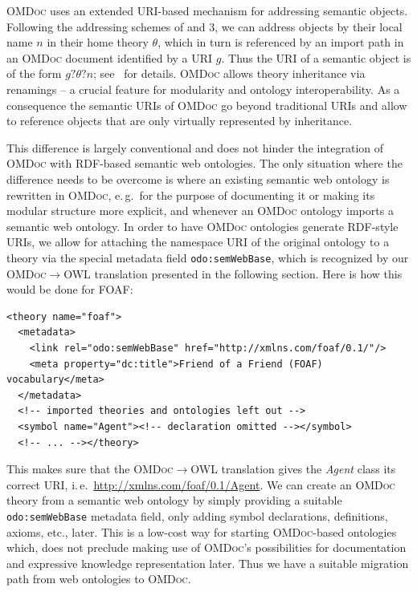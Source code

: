 \documentclass{llncs}
\renewcommand{\omdoc}{\textsc{OMDoc}\xspace}
\begin{document}
\omdoc uses an extended URI-based mechanism for addressing semantic objects. Following the
addressing schemes of {\openmath} and {\mathml}3, we can address objects by their local
name $n$ in their home theory $\theta$, which in turn is referenced by an import path in
an {\omdoc} document identified by a URI $g$. Thus the URI of a semantic object is of the
form $g?\theta?n$; see~\cite{RabeKohlhase:ExchangeModularKnowledge} for details.  {\omdoc}
allows theory inheritance via renamings -- a crucial feature for modularity and ontology
interoperability. As a consequence the semantic URIs of {\omdoc} go beyond traditional
URIs and allow to reference objects that are only virtually represented by inheritance.

This difference is largely conventional and does not hinder the integration of {\omdoc}
with RDF-based semantic web ontologies. The only situation where the difference needs to
be overcome is where an existing semantic web ontology is rewritten in \omdoc, e.\,g.\ for
the purpose of documenting it or making its modular structure more explicit, and whenever
an \omdoc ontology imports a semantic web ontology.  In order to have \omdoc ontologies
generate RDF-style URIs, we allow for attaching the namespace URI of the original ontology
to a theory via the special metadata field \texttt{odo:semWebBase}, which is recognized by
our {\omdoc}$\to$OWL translation presented in the following section.  Here is how this
would be done for FOAF:

\begin{lstlisting}
<theory name="foaf">
  <metadata>
    <link rel="odo:semWebBase" href="http://xmlns.com/foaf/0.1/"/>
    <meta property="dc:title">Friend of a Friend (FOAF) vocabulary</meta>
  </metadata>
  <!-- imported theories and ontologies left out -->
  <symbol name="Agent"><!-- declaration omitted --></symbol>
  <!-- ... --></theory>
\end{lstlisting}

This makes sure that the {\omdoc}$\to$OWL translation gives the \textit{Agent} class its
correct URI, i.\,e.\ \url{http://xmlns.com/foaf/0.1/Agent}.  We can create an \omdoc
theory from a semantic web ontology by simply providing a suitable \texttt{odo:semWebBase}
metadata field, only adding symbol declarations, definitions, axioms, etc., later.  This
is a low-cost way for starting {\omdoc}-based ontologies which, does not preclude making
use of \omdoc's possibilities for documentation and expressive knowledge representation
later.  Thus we have a suitable migration path from web ontologies to \omdoc.
\end{document}
